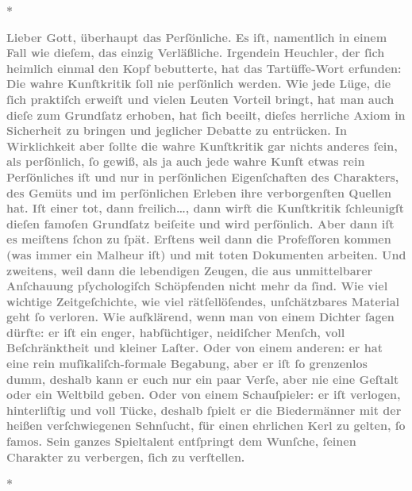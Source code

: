 \pstart
           \centering{}\textcolor{gray}{\textbf{*}}\pend
           
\pstart
           \textcolor{gray}{\textbf{Lieber Gott, überhaupt das Perſönliche. Es iſt, namentlich in
                  einem Fall wie dieſem, das einzig Verläßliche. Irgendein Heuchler, der ſich
                  heimlich einmal den Kopf bebutterte, hat das Tartüffe-Wort erfunden: Die wahre Kunſtkritik ſoll nie
                  perſönlich werden. Wie jede Lüge, die ſich praktiſch erweiſt und vielen Leuten
                  Vorteil bringt, hat man auch dieſe zum Grundſatz erhoben, hat ſich beeilt, dieſes
                  herrliche Axiom in Sicherheit zu bringen und jeglicher Debatte zu entrücken. In
                  Wirklichkeit aber ſollte die wahre Kunſtkritik gar nichts anderes ſein, als
                  perſönlich, ſo gewiß, als ja auch jede wahre Kunſt etwas rein Perſönliches iſt und
                  nur in perſönlichen Eigenſchaften des Charakters, des Gemüts und im perſönlichen
                  Erleben ihre verborgenſten Quellen hat. Iſt einer tot, dann freilich{\dots}, dann wirft die Kunſtkritik ſchleunigſt dieſen
                  famoſen Grundſatz beiſeite und wird perſönlich. Aber dann iſt es meiſtens ſchon zu
                  ſpät. Erſtens weil dann die Profeſſoren kommen (was immer ein Malheur iſt) und mit
                  toten Dokumenten arbeiten. Und zweitens, weil dann die lebendigen Zeugen, die aus
                  unmittelbarer Anſchauung pſychologiſch Schöpfenden nicht mehr da ſind. Wie viel
                  wichtige Zeitgeſchichte, wie viel rätſellöſendes, unſchätzbares Material geht ſo
                  verloren. Wie aufklärend, wenn man von einem Dichter ſagen dürfte: er iſt ein
                  enger, habſüchtiger, neidiſcher Menſch, voll Beſchränktheit und kleiner Laſter.
                  Oder von einem anderen: er hat eine rein muſikaliſch-formale Begabung, aber er iſt
                  ſo grenzenlos dumm, deshalb kann er euch nur ein paar Verſe, aber nie eine Geſtalt
                  oder ein Weltbild geben. Oder von einem Schauſpieler: er iſt verlogen,
                  hinterliſtig und voll Tücke, deshalb ſpielt er die Biedermänner mit der heißen
                  verſchwiegenen Sehnſucht, für einen ehrlichen Kerl zu gelten, ſo famos. Sein
                  ganzes Spieltalent entſpringt dem Wunſche, ſeinen Charakter zu verbergen, ſich zu
                  verſtellen.}}\pend
           
\pstart
           \centering{}\textcolor{gray}{\textbf{*}}\pend
           

